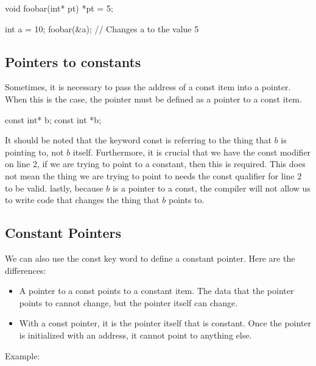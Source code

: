 \documentclass{report}
\begin{document}
    \begin{cppcode}
void foobar(int* pt) {
    *pt = 5;
}

int a = 10;
foobar(&a); // Changes a to the value 5

    \end{cppcode}
    

    \bigbreak \noindent 
    \subsection{Pointers to constants}
    \bigbreak \noindent 
    Sometimes, it is necessary to pass the address of a const item into a pointer. When this is the case, the pointer must be defined as a pointer to a const item.
    \bigbreak \noindent 
    
    \begin{cppcode}
const int* b; 
const int *b;
    \end{cppcode}
    
    \bigbreak \noindent 
    \begin{notebox}
			It should be noted that the keyword const is referring to the thing that $b$ is pointing to, not $b$ itself. Furthermore, it is crucial that we have the const modifier on line 2, if we are trying to point to a constant, then this is required. This does not mean the thing we are trying to point to needs the const qualifier for line 2 to be valid. lastly, because $b$ is a pointer to a const, the compiler will not allow us to write code that changes the thing that $b$ points to.
		\end{notebox}
    \bigbreak \noindent 

    \pagebreak \bigbreak \noindent 
    \subsection{Constant Pointers}
    \bigbreak \noindent 
    We can also use the const key word to define a constant pointer. Here are the differences:
    \begin{itemize}
        \item A pointer to a const points to a constant item. The data that the pointer points to cannot change, but the pointer itself can change. 
        \item With a const pointer, it is the pointer itself that is constant.  Once the pointer is initialized with an address, it cannot point to anything else.
    \end{itemize}
    \bigbreak \noindent 
    Example:
    \bigbreak \noindent 
    
\end{document}
